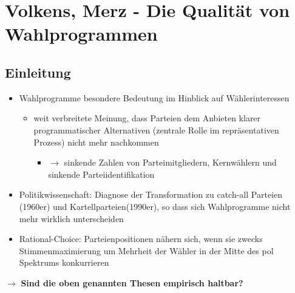 \documentclass[11pt]{article}
\date{\today}
\title{}
\begin{document}
\tableofcontents

\section{Volkens, Merz - Die Qualität von Wahlprogrammen}
\label{sec:org0fdb53c}
\subsection{Einleitung}
\label{sec:org2af14eb}
\begin{itemize}
\item Wahlprogramme besondere Bedeutung im Hinblick auf Wählerinteressen
\begin{itemize}
\item weit verbreitete Meinung, dass Parteien dem Anbieten klarer programmatischer Alternativen (zentrale Rolle im repräsentativen Prozess) nicht mehr nachkommen
\begin{itemize}
\item \(\rightarrow\) sinkende Zahlen von Parteimitgliedern, Kernwählern und sinkende Parteiidentifikation
\end{itemize}
\end{itemize}
\item Politikwissenschaft: Diagnose der Transformation zu catch-all Parteien (1960er) und Kartellparteien(1990er), so dass sich Wahlprogramme nicht mehr wirklich unterscheiden
\item Rational-Choice: Parteienpositionen nähern sich, wenn sie zwecks Stimmenmaximierung um Mehrheit der Wähler in der Mitte des pol Spektrums konkurrieren
\end{itemize}

\(\rightarrow\) \textbf{Sind die oben genannten Thesen empirisch haltbar?}
\end{document}
